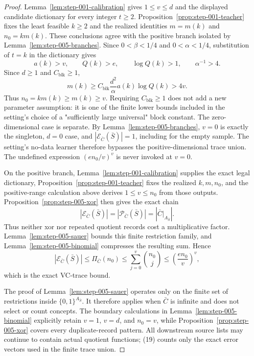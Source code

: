 \begin{proof}
Lemma~\ref{lem:step-001-calibration} gives \(1\le v\le d\) and
the displayed candidate dictionary for every integer \(t\ge2\).
Proposition~\ref{prop:step-001-teacher} fixes the least feasible
\(k\ge2\) and the realized identities \(m=m(k)\) and \(n_0=km(k)\).
These  conclusions agree with the positive branch isolated by
Lemma~\ref{lem:step-005-branches}.  Since \(0<\beta<1/4\) and
\(0<\alpha<1/4\), substitution of \(t=k\) in the  dictionary gives
\[
a(k)>v,\qquad Q(k)>e,\qquad
\log Q(k)>1,\qquad \alpha^{-1}>4.
\]
Since \(d\ge1\) and \(C_{\mathrm{blk}}\ge1\),
\[
m(k)
\ge C_{\mathrm{blk}}\frac{d^2}{\alpha}a(k)\log Q(k)
>4v.
\tag{17}
\]
Thus \(n_0=km(k)\ge m(k)\ge v\).  Requiring
\(C_{\mathrm{blk}}\ge1\) does not add a new parameter assumption: it is one
of the finite lower bounds included in the setting's choice of a
"sufficiently large universal" block constant. 
The zero-dimensional case is separate.  By
Lemma~\ref{lem:step-005-branches}, \(v=0\) is exactly the singleton,
\(d=0\) case, and
\(|\mathcal E_{\bar C}(\bar S)|=1\), including for the empty sample.  The
setting's no-data learner therefore bypasses the positive-dimensional trace
union.  The undefined expression \((e n_0/v)^v\) is never invoked at
\(v=0\).

On the positive branch, Lemma~\ref{lem:step-001-calibration} supplies the
exact legal dictionary, Proposition~\ref{prop:step-001-teacher} fixes the
realized \(k,m,n_0\), and the positive-range calculation above derives
\(1\le v\le n_0\) from those  outputs.  Proposition~\ref{prop:step-005-xor}
then gives the exact chain
\[
|\mathcal E_{\bar C}(\bar S)|
=|\mathcal P_{\bar C}(\bar S)|
=\left|\bar C|_{A_{\bar S}}\right|.
\tag{18}
\]
Thus neither xor nor repeated quotient records cost a multiplicative factor.
Lemma~\ref{lem:step-005-sauer} bounds this finite restriction family, and
Lemma~\ref{lem:step-005-binomial} compresses the resulting sum.  Hence
\[
|\mathcal E_{\bar C}(\bar S)|
\le \Pi_{\bar C}(n_0)
\le \sum_{j=0}^{v}\binom{n_0}{j}
\le \left(\frac{e n_0}{v}\right)^v,
\tag{19}
\]
which is the exact VC-trace bound.

The proof of Lemma~\ref{lem:step-005-sauer} operates only on the finite set
of restrictions inside \(\{0,1\}^{A_{\bar S}}\).  It therefore applies when
\(\bar C\) is infinite and does not select or count concepts.  The boundary
calculations in Lemma~\ref{lem:step-005-binomial} explicitly retain
\(v=1\), \(v=d\), and \(n_0=v\), while
Proposition~\ref{prop:step-005-xor} covers every duplicate-record pattern.
All downstream source lists may continue to contain actual quotient
functions; (19) counts only the exact error vectors used in the finite
trace union.



\end{proof}

